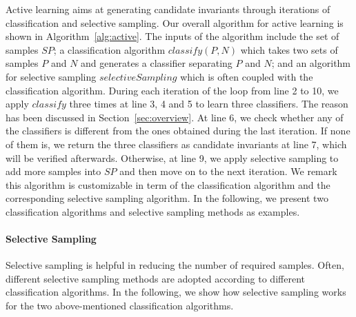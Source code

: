Active learning aims at generating candidate invariants through iterations of classification and selective sampling. Our overall algorithm for active learning is shown in Algorithm~\ref{alg:active}. The inputs of the algorithm include the set of samples $\mathit{SP}$; a classification algorithm $\mathit{classify}(P,N)$ which takes two sets of samples $P$ and $N$ and generates a classifier separating $P$ and $N$; and an algorithm for selective sampling $\mathit{selectiveSampling}$ which is often coupled with the classification algorithm. During each iteration of the loop from line 2 to 10, we apply $\mathit{classify}$ three times at line 3, 4 and 5 to learn three classifiers. The reason has been discussed in Section~\ref{sec:overview}. At line 6, we check whether any of the classifiers is different from the ones obtained during the last iteration. If none of them is, we return the three classifiers as candidate invariants at line 7, which will be verified afterwards. Otherwise, at line 9, we apply selective sampling to add more samples into $\mathit{SP}$ and then move on to the next iteration. We remark this algorithm is customizable in term of the classification algorithm and the corresponding selective sampling algorithm. In the following, we present two classification algorithms and selective sampling methods as examples.

\paragraph{Selective Sampling} \label{subsec:active:learning}
Selective sampling is helpful in reducing the number of required samples.
Often, different selective sampling methods are adopted according to different classification algorithms.
In the following, we show how selective sampling works for the two above-mentioned classification algorithms. %

